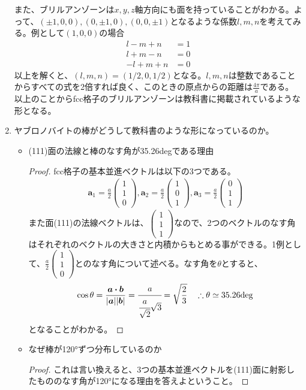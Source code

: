\documentclass[a4paper,11pt,dvipdfmx]{jsarticle}
\begin{document}
\begin{enumerate}
    また、ブリルアンゾーンは$x, y, z$軸方向にも面を持っていることがわかる。よって、$(\pm 1, 0, 0), (0, \pm 1, 0), (0, 0, \pm 1)$となるような係数$l, m, n$を考えてみる。例として$(1, 0, 0)$の場合
    \begin{align*}
      l - m + n &= 1 \\
      l + m - n &= 0 \\
      -l + m + n &= 0 
    \end{align*}
    以上を解くと、$(l, m, n) = (1/2, 0, 1/2)$となる。$l, m, n$は整数であることからすべての式を2倍すれば良く、このときの原点からの距離は$\displaystyle \frac{4\pi}{a}$である。
    以上のことからfcc格子のブリルアンゾーンは教科書に掲載されているような形となる。
  \item ヤブロノバイトの棒がどうして教科書のような形になっているのか。
    \begin{itemize}
      \item (111)面の法線と棒のなす角が35.26degである理由
      \begin{proof}
        fcc格子の基本並進ベクトルは以下の3つである。
        \begin{align*}
          \boldsymbol{a}_1 = \frac{a}{2}\begin{pmatrix} 1 \\ 1 \\ 0\end{pmatrix}, 
          \boldsymbol{a}_2 = \frac{a}{2}\begin{pmatrix} 1 \\ 0 \\ 1\end{pmatrix}, 
          \boldsymbol{a}_3 = \frac{a}{2}\begin{pmatrix} 0 \\ 1 \\ 1\end{pmatrix}
        \end{align*}
        また面(111)の法線ベクトルは、$\begin{pmatrix}1 \\ 1 \\ 1\end{pmatrix}$なので、2つのベクトルのなす角はそれぞれのベクトルの大きさと内積からもとめる事ができる。1例として、$\displaystyle \frac{a}{2}\begin{pmatrix} 1 \\ 1 \\ 0\end{pmatrix}$とのなす角について述べる。なす角を$\theta$とすると、
        \begin{align*}
          \cos \theta = \frac{ \boldsymbol{a \cdot b} }{| \boldsymbol{a} | | \boldsymbol{b} |} = \cfrac{a}{\cfrac{a}{\sqrt{2}} \sqrt{3}} = \sqrt{\frac{2}{3}} \quad \therefore \theta \simeq 35.26 \mathrm{deg}
        \end{align*}
        となることがわかる。
      \end{proof}
  \item なぜ棒が120°ずつ分布しているのか
    \begin{proof}
      これは言い換えると、3つの基本並進ベクトルを(111)面に射影したもののなす角が120°になる理由を答えよということ。
      

\end{proof}
\end{itemize}
\end{enumerate}
\end{document}
